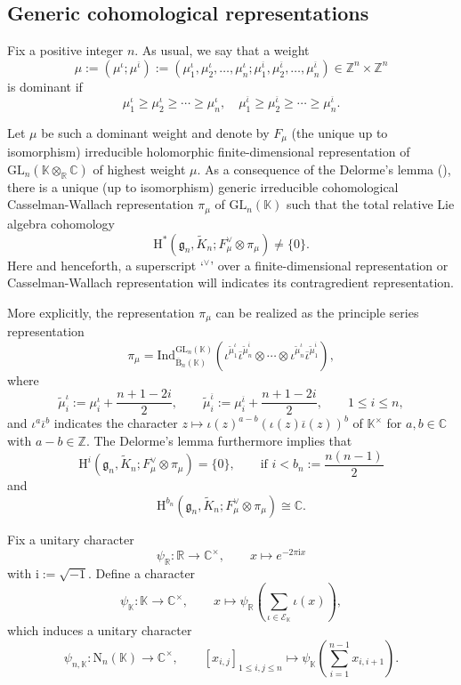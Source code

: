 \documentclass[12pt, a4paper]{amsart}
\newcommand{\CE}{{\mathcal {E}}}
\newcommand{\RB}{{\mathrm {B}}}
\newcommand{\RH}{{\mathrm {H}}}
\newcommand{\RN}{{\mathrm {N}}}
\newcommand{\GL}{{\mathrm{GL}}}
\newcommand{\Z}{\mathbb{Z}}
\newcommand{\C}{\mathbb{C}}
\newcommand{\R}{\mathbb R}
\newcommand{\K}{\mathbb{K}}
\theoremstyle{Theorem}
\theoremstyle{Theorem}
\theoremstyle{Theorem}
\theoremstyle{Theorem}
\theoremstyle{Plain}
\theoremstyle{Definition}
\begin{document}
	
	\subsection{Generic cohomological representations}
	
	Fix a positive integer $n$. As usual, we say that a weight
	\[
	\mu:=(\mu^{\iota};\mu^{\overline{\iota}}):=(\mu_1^{\iota},\mu_2^{\iota},\dots,\mu_n^{\iota};\mu_1^{\overline{\iota}},\mu_2^{\overline{\iota}},\dots,\mu_n^{\overline{\iota}})\in\Z^n\times\Z^n
	\]
	is dominant if
	\[
	\mu_1^{\iota}\geq\mu_2^{\iota}\geq\cdots\geq\mu_n^{\iota},\quad\mu_1^{\overline{\iota}}\geq\mu_2^{\overline{\iota}}\geq\cdots\geq\mu_n^{\overline{\iota}}.
	\]
	
	Let $\mu$ be such a dominant weight and denote by $F_{\mu}$ (the unique up to isomorphism) irreducible holomorphic finite-dimensional representation of $\GL_n(\K\otimes_{\R}\C)$ of highest weight $\mu$. As a consequence of the Delorme's lemma (\cite[Theorem III.3.3]{BW}), there is a unique (up to isomorphism) generic irreducible cohomological Casselman-Wallach representation $\pi_{\mu}$ of $\GL_n(\K)$ such that the total relative Lie algebra cohomology
	\[
	\RH^{\ast}\left(\mathfrak{g}_n,\widetilde{K}_n;F_{\mu}^{\vee}\otimes\pi_{\mu}\right)\neq\{0\}.
	\]
	Here and henceforth, a superscript `$^{\vee}$' over a finite-dimensional representation or Casselman-Wallach representation will indicates its contragredient representation. 
	
	More explicitly, the representation $\pi_{\mu}$ can be realized as the principle series representation
	\[
	\pi_{\mu}=\mathrm{Ind}^{\GL_n(\K)}_{\overline{\RB}_n(\K)}\left(\iota^{\widetilde{\mu}_1^{\iota}}\overline{\iota}^{\widetilde{\mu}_n^{\overline{\iota}}}\otimes\cdots\otimes\iota^{\widetilde{\mu}_n^{\iota}}\overline{\iota}^{\widetilde{\mu}_1^{\overline{\iota}}}\right),
	\]
	where
	\[
	\widetilde{\mu}_i^{\iota}:=\mu_i^{\iota}+\frac{n+1-2i}{2},\qquad\widetilde{\mu}_i^{\overline{\iota}}:=\mu_i^{\overline{\iota}}+\frac{n+1-2i}{2},\qquad 1\leq i\leq n,
	\]
	and $\iota^a\overline{\iota}^b$ indicates the character $z\mapsto\iota(z)^{a-b}(\iota(z)\overline{\iota}(z))^b$ of $\K^{\times}$ for $a,b\in\C$ with $a-b\in\Z$. The Delorme's lemma furthermore implies that
	\[
	\RH^{i}\left(\mathfrak{g}_n,\widetilde{K}_n;F_{\mu}^{\vee}\otimes\pi_{\mu}\right)=\{0\},\qquad\text{if }i<b_n:=\frac{n(n-1)}{2}
	\]
	and
	\[
	\RH^{b_n}\left(\mathfrak{g}_n,\widetilde{K}_n;F_{\mu}^{\vee}\otimes\pi_{\mu}\right)\cong\C.
	\]
	
	Fix a unitary character 
	\[
	\psi_{\R}:\R\to\C^{\times},\qquad x\mapsto e^{-2\pi\mathrm{i}x}
	\]
	with $\mathrm{i}:=\sqrt{-1}$. Define a character
	\[
	\psi_{\K}:\K\to\C^{\times},\qquad x\mapsto\psi_{\R}\left(\sum_{\iota\in\CE_{\K}}\iota(x)\right),
	\]
	which induces a unitary character
	\[
	\psi_{n,\K}:\RN_n(\K)\to\C^{\times},\qquad [x_{i,j}]_{1\leq i,j\leq n}\mapsto\psi_{\K}\left(\sum_{i=1}^{n-1}x_{i,i+1}\right).
	\]
	
\end{document}

